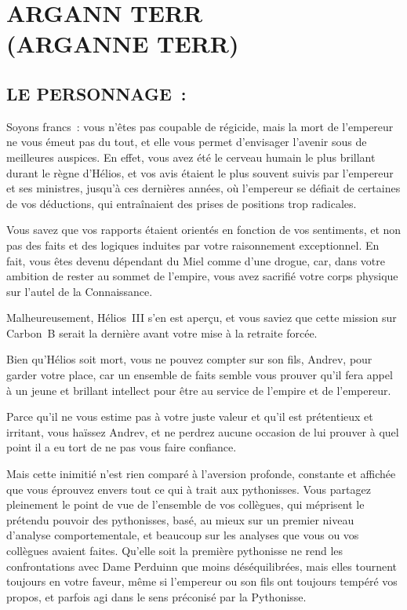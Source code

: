 \documentclass[14pt,twocolumn]{extarticle}
\begin{document}
\section{ARGANN TERR\\(ARGANNE TERR)}

\subsection{LE PERSONNAGE~:}

Soyons francs~: vous n'êtes pas coupable de régicide, mais la mort de
l'empereur ne vous émeut pas du tout, et elle vous permet d'envisager l'avenir
sous de meilleures auspices. En effet, vous avez été le cerveau humain le plus
brillant durant le règne d'Hélios, et vos avis étaient le plus souvent suivis
par l'empereur et ses ministres, jusqu'à ces dernières années, où l'empereur se
défiait de certaines de vos déductions, qui entraînaient des prises de
positions trop radicales.

Vous savez que vos rapports étaient orientés en fonction de vos sentiments, et
non pas des faits et des logiques induites par votre raisonnement exceptionnel.
En fait, vous êtes devenu dépendant du Miel comme d'une drogue, car, dans votre
ambition de rester au sommet de l'empire, vous avez sacrifié votre corps
physique sur l'autel de la Connaissance.

Malheureusement, Hélios~III s'en est aperçu, et vous saviez que cette mission
sur Carbon~B serait la dernière avant votre mise à la retraite forcée.

Bien qu'Hélios soit mort, vous ne pouvez compter sur son fils, Andrev, pour
garder votre place, car un ensemble de faits semble vous prouver qu'il fera
appel à un jeune et brillant intellect pour être au service de l'empire et de
l'empereur.

Parce qu'il ne vous estime pas à votre juste valeur et qu'il est prétentieux et
irritant, vous haïssez Andrev, et ne perdrez aucune occasion de lui prouver à
quel point il a eu tort de ne pas vous faire confiance.

Mais cette inimitié n'est rien comparé à l'aversion profonde, constante et
affichée que vous éprouvez envers tout ce qui à trait aux pythonisses. Vous
partagez pleinement le point de vue de l'ensemble de vos collègues, qui
méprisent le prétendu pouvoir des pythonisses, basé, au mieux sur un premier
niveau d'analyse comportementale, et beaucoup sur les analyses que vous ou vos
collègues avaient faites. Qu'elle soit la première pythonisse ne rend les
confrontations avec Dame Perduinn que moins déséquilibrées, mais elles tournent
toujours en votre faveur, même si l'empereur ou son fils ont toujours tempéré
vos propos, et parfois agi dans le sens préconisé par la Pythonisse.
\end{document}
